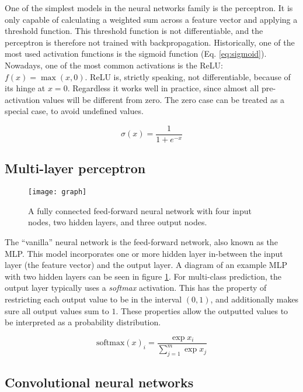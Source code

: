 One of the simplest models in the neural networks family is the perceptron.
It is only capable of calculating a weighted sum across a feature vector and
applying a threshold function. This threshold function is not differentiable,
and the perceptron is therefore not trained with backpropagation.
Historically, one of the most used activation functions is the sigmoid
function (Eq. \ref{eq:sigmoid}). Nowadays, one of the most
common activations is the \ac{ReLU}: \(f(x) = \max(x, 0)\). \ac{ReLU} is,
strictly speaking, not differentiable, because of its hinge at $x = 0$.
Regardless it works well in practice, since almost all pre-activation values
will be different from zero. The zero case can be treated as a special case,
to avoid undefined values.

\begin{equation} \label{eq:sigmoid}
  \sigma(x) = {\frac{1}{1 + e^{-x}}}
\end{equation}

\subsection{Multi-layer perceptron}

\begin{figure}
  \centering
  \texttt{[image: graph]}
  \caption{A fully connected feed-forward neural network with four input
  nodes, two hidden layers, and three output nodes.}
  \label{fig:mlp-diagram}
\end{figure}

The ``vanilla'' neural network is the feed-forward network, also known as the
\ac{MLP}. This model incorporates one or more
hidden layer in-between the input layer (the feature vector) and the output
layer. A diagram of an example \ac{MLP} with two hidden layers can be seen in
figure \ref{fig:mlp-diagram}. For multi-class prediction, the output layer
typically uses a \emph{softmax} activation. This has the property of
restricting each output value to be in the interval $(0,1)$, and additionally
makes sure all output values sum to $1$. These properties allow the outputted
values to be interpreted as a probability distribution.

\begin{equation}\label{eq:softmax}
  \mathrm{softmax}(x)_i = \frac{\exp{x_i}}{\sum_{j=1}^{m}\exp{x_j}}
\end{equation}

\subsection{Convolutional neural networks}

